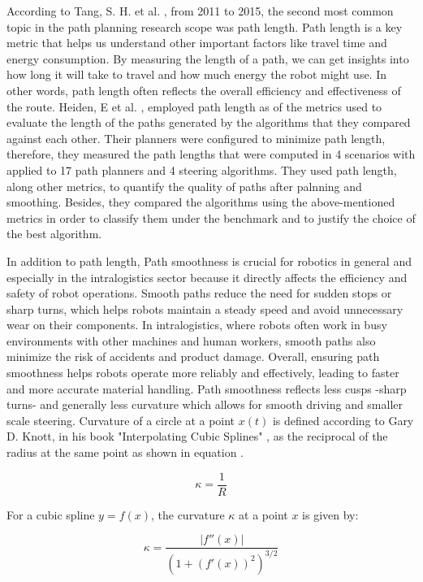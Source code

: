According to Tang, S. H. et al. \cite{R20}, from 2011 to 2015, the second most common topic in the path 
planning research scope was path length. Path length is a key metric that helps us understand other 
important factors like travel time and energy consumption. By measuring the length of a path, we 
can get insights into how long it will take to travel and how much energy the robot might use. 
In other words, path length often reflects the overall efficiency and effectiveness of the route. 
Heiden, E et al. \cite{R23}, employed path length as of the metrics used to evaluate the length of 
the paths generated by the algorithms that they compared against each other. Their planners 
were configured to minimize path length, therefore, they measured the path lengths that were computed 
in 4 scenarios with applied to 17 path planners and 4 steering algorithms. They used path length,
along other metrics, to quantify the quality of paths after palnning and smoothing.
Besides, they compared the algorithms using the above-mentioned metrics in order to classify them
under the benchmark and to justify the choice of the best algorithm.  

In addition to path length, Path smoothness is crucial for robotics in general and especially 
in the intralogistics sector because it directly affects the efficiency and safety of robot 
operations. Smooth paths reduce the need for sudden stops or sharp turns, which helps robots 
maintain a steady speed and avoid unnecessary wear on their components. In intralogistics, 
where robots often work in busy environments with other machines and human workers, smooth 
paths also minimize the risk of accidents and product damage. Overall, ensuring path 
smoothness helps robots operate more reliably and effectively, leading to faster and 
more accurate material handling. Path smoothness reflects less cusps -sharp turns- and generally
less curvature which allows for smooth driving and smaller scale steering.
Curvature of a circle at a point \(x(t)\) is defined according to Gary D. Knott, in his book 
"Interpolating Cubic Splines" \cite{R34}, as the reciprocal of the radius at the same point as shown in
equation .

\begin{equation}
    \kappa = \frac{1}{R}
    \label{kurv}
\end{equation}

For a cubic spline \( y = f(x) \), the curvature \( \kappa \) at a point \( x \) is given by:

\begin{equation}
\kappa = \frac{|f''(x)|}{\left(1 + \left(f'(x)\right)^2\right)^{3/2}}
\end{equation}

